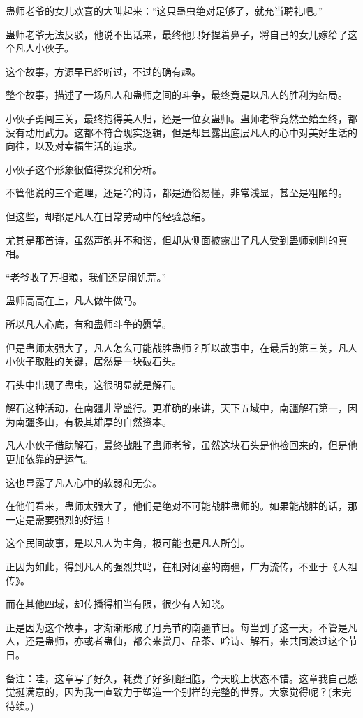 \begin{this_body}
蛊师老爷的女儿欢喜的大叫起来：“这只蛊虫绝对足够了，就充当聘礼吧。”

蛊师老爷无法反驳，他说不出话来，最终他只好捏着鼻子，将自己的女儿嫁给了这个凡人小伙子。

这个故事，方源早已经听过，不过的确有趣。

整个故事，描述了一场凡人和蛊师之间的斗争，最终竟是以凡人的胜利为结局。

小伙子勇闯三关，最终抱得美人归，还是一位女蛊师。蛊师老爷竟然至始至终，都没有动用武力。这都不符合现实逻辑，但是却显露出底层凡人的心中对美好生活的向往，以及对幸福生活的追求。

小伙子这个形象很值得探究和分析。

不管他说的三个道理，还是吟的诗，都是通俗易懂，非常浅显，甚至是粗陋的。

但这些，却都是凡人在日常劳动中的经验总结。

尤其是那首诗，虽然声韵并不和谐，但却从侧面披露出了凡人受到蛊师剥削的真相。

“老爷收了万担粮，我们还是闹饥荒。”

蛊师高高在上，凡人做牛做马。

所以凡人心底，有和蛊师斗争的愿望。

但是蛊师太强大了，凡人怎么可能战胜蛊师？所以故事中，在最后的第三关，凡人小伙子取胜的关键，居然是一块破石头。

石头中出现了蛊虫，这很明显就是解石。

解石这种活动，在南疆非常盛行。更准确的来讲，天下五域中，南疆解石第一，因为南疆多山，有极其雄厚的自然资本。

凡人小伙子借助解石，最终战胜了蛊师老爷，虽然这块石头是他捡回来的，但是他更加依靠的是运气。

这也显露了凡人心中的软弱和无奈。

在他们看来，蛊师太强大了，他们是绝对不可能战胜蛊师的。如果能战胜的话，那一定是需要强烈的好运！

这个民间故事，是以凡人为主角，极可能也是凡人所创。

正因为如此，得到凡人的强烈共鸣，在相对闭塞的南疆，广为流传，不亚于《人祖传》。

而在其他四域，却传播得相当有限，很少有人知晓。

正是因为这个故事，才渐渐形成了月亮节的南疆节日。每当到了这一天，不管是凡人，还是蛊师，亦或者蛊仙，都会来赏月、品茶、吟诗、解石，来共同渡过这个节日。

备注：哇，这章写了好久，耗费了好多脑细胞，今天晚上状态不错。这章我自己感觉挺满意的，因为我一直致力于塑造一个别样的完整的世界。大家觉得呢？(未完待续。)

\end{this_body}

